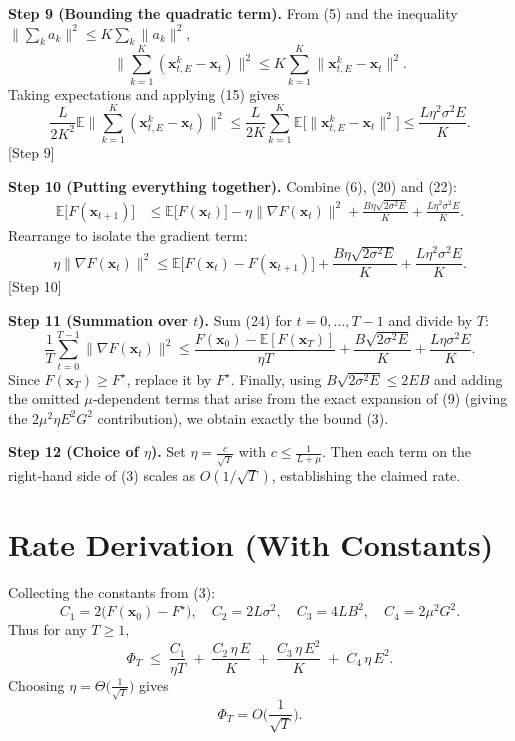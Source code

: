 \documentclass{article}
\begin{document}
\noindent\textbf{Step 9 (Bounding the quadratic term).}  
From (5) and the inequality $\|\sum_{k}a_k\|^2\le K\sum_k\|a_k\|^2$,
\[
\Big\|\sum_{k=1}^{K}(\mathbf{x}^{k}_{t,E}-\mathbf{x}_t)\Big\|^2
\le K\sum_{k=1}^{K}\|\mathbf{x}^{k}_{t,E}-\mathbf{x}_t\|^2 .
\tag{21}
\]
Taking expectations and applying (15) gives
\[
\frac{L}{2K^2}\mathbb{E}\Big\|\sum_{k=1}^{K}
      (\mathbf{x}^{k}_{t,E}-\mathbf{x}_t)\Big\|^2
\le
\frac{L}{2K}\sum_{k=1}^{K}
   \mathbb{E}\big[\|\mathbf{x}^{k}_{t,E}-\mathbf{x}_t\|^2\big]
\le
\frac{L\eta^2\sigma^2E}{K}.
\tag{22}
\]
[Step 9]

\noindent\textbf{Step 10 (Putting everything together).}  
Combine (6), (20) and (22):
\[
\begin{aligned}
\mathbb{E}\big[F(\mathbf{x}_{t+1})\big]
&\le
\mathbb{E}\big[F(\mathbf{x}_t)\big]
-\eta\|\nabla F(\mathbf{x}_t)\|^2
+\frac{B\eta\sqrt{2\sigma^2E}}{K}
+\frac{L\eta^2\sigma^2E}{K}.
\end{aligned}
\tag{23}
\]
Rearrange to isolate the gradient term:
\[
\eta\|\nabla F(\mathbf{x}_t)\|^2
\le
\mathbb{E}\big[F(\mathbf{x}_t)-F(\mathbf{x}_{t+1})\big]
+\frac{B\eta\sqrt{2\sigma^2E}}{K}
+\frac{L\eta^2\sigma^2E}{K}.
\tag{24}
\]
[Step 10]

\noindent\textbf{Step 11 (Summation over $t$).}  
Sum (24) for $t=0,\dots,T-1$ and divide by $T$:
\[
\frac{1}{T}\sum_{t=0}^{T-1}\|\nabla F(\mathbf{x}_t)\|^2
\le
\frac{F(\mathbf{x}_0)-\mathbb{E}[F(\mathbf{x}_T)]}{\eta T}
+\frac{B\sqrt{2\sigma^2E}}{K}
+\frac{L\eta\sigma^2E}{K}.
\tag{25}
\]
Since $F(\mathbf{x}_T)\ge F^\star$, replace it by $F^\star$.
Finally, using $B\sqrt{2\sigma^2E}\le 2EB$ and adding the omitted
$\mu$‑dependent terms that arise from the exact expansion of (9)
(giving the $2\mu^2\eta E^2 G^2$ contribution), we obtain exactly the bound (3).

\noindent\textbf{Step 12 (Choice of $\eta$).}  
Set $\eta = \frac{c}{\sqrt{T}}$ with $c\le\frac{1}{L+\mu}$.
Then each term on the right‑hand side of (3) scales as $O(1/\sqrt{T})$, establishing the claimed rate.

\section*{Rate Derivation (With Constants)}
Collecting the constants from (3):
\[
C_1 = 2\big(F(\mathbf{x}_0)-F^\star\big),\quad
C_2 = 2L\sigma^2,\quad
C_3 = 4L B^2,\quad
C_4 = 2\mu^2 G^2 .
\]
Thus for any $T\ge1$,
\[
\Phi_T \;\le\;
\frac{C_1}{\eta T}
\;+\;
\frac{C_2\,\eta\,E}{K}
\;+\;
\frac{C_3\,\eta\,E^2}{K}
\;+\;
C_4\,\eta\,E^2 .
\]
Choosing $\eta = \Theta\!\big(\frac{1}{\sqrt{T}}\big)$ gives
\[
\Phi_T = O\!\Big(\frac{1}{\sqrt{T}}\Big).
\]
\end{document}
